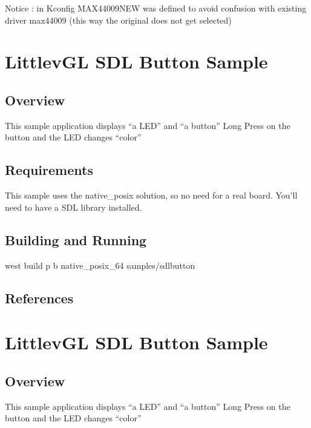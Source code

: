 \documentclass[letterpaper,10pt,english]{sphinxmanual}
\begin{document}
Notice :  in Kconfig MAX44009NEW was defined to avoid confusion with existing driver max44009
(this way the original does not get selected)


\section{LittlevGL SDL Button  Sample}
\label{\detokenize{samples/samplespinebuttonREADME:littlevgl-sdl-button-sample}}\label{\detokenize{samples/samplespinebuttonREADME:sdl-sample}}\label{\detokenize{samples/samplespinebuttonREADME::doc}}

\subsection{Overview}
\label{\detokenize{samples/samplespinebuttonREADME:overview}}
This sample application displays “a LED” and “a button”
Long Press on the button and the LED changes “color”


\subsection{Requirements}
\label{\detokenize{samples/samplespinebuttonREADME:requirements}}
This sample uses the native\_posix solution, so no need for a real board.
You’ll need to have a SDL library installed.


\subsection{Building and Running}
\label{\detokenize{samples/samplespinebuttonREADME:building-and-running}}
west build \sphinxhyphen{}p \sphinxhyphen{}b native\_posix\_64 samples/sdlbutton


\subsection{References}
\label{\detokenize{samples/samplespinebuttonREADME:references}}

\section{LittlevGL SDL Button  Sample}
\label{\detokenize{samples/samplessdlbuttonREADME:littlevgl-sdl-button-sample}}\label{\detokenize{samples/samplessdlbuttonREADME:sdl-sample}}\label{\detokenize{samples/samplessdlbuttonREADME::doc}}

\subsection{Overview}
\label{\detokenize{samples/samplessdlbuttonREADME:overview}}
This sample application displays “a LED” and “a button”
Long Press on the button and the LED changes “color”
\end{document}
